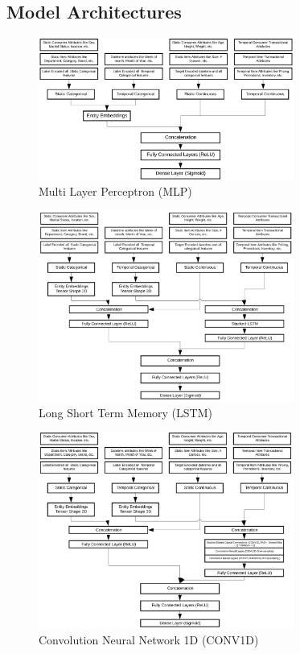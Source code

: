 \subsection{Model Architectures}

  \begin{figure}[t]
    \centering 
    \includegraphics[width=3.3in]{img/MLP.png} 
    \caption{Multi Layer Perceptron (MLP)} 
    \label{fig:MLP} 
  \end{figure}

  \begin{figure}[t]
    \centering 
    \includegraphics[width=3.3in]{img/LSTM.png} 
    \caption{Long Short Term Memory (LSTM)} 
    \label{fig:LSTM} 
  \end{figure}

  \begin{figure}[t]
    \centering 
    \includegraphics[width=3.3in]{img/CONV1D.png} 
    \caption{Convolution Neural Network 1D (CONV1D)} 
    \label{fig:CONV1D} 
  \end{figure}

